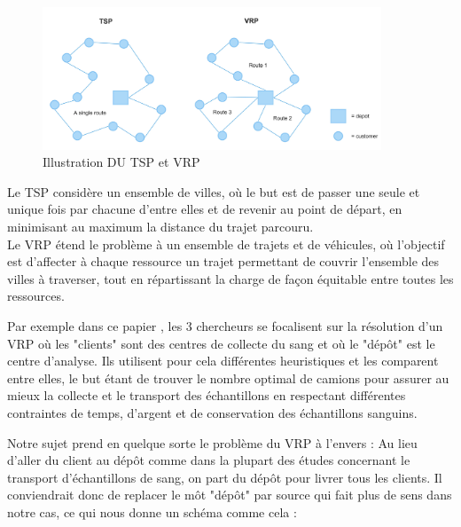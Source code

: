 \documentclass{polytech/polytech}
\numberwithin{figure}{chapter}
\begin{document}
\begin{figure}[h]
    \centering
    \includegraphics[width=0.9\textwidth]{pic/TSPVRP.png}
    \caption{Illustration DU TSP et VRP}
    \label{Illustration DU TSP et VRP}
\end{figure}

Le TSP considère un ensemble de villes, où le but est de passer une seule et unique fois par chacune d'entre elles et de revenir au point de départ, en minimisant au maximum la distance du trajet parcouru.\\
Le VRP étend le problème à un ensemble de trajets et de véhicules, où l'objectif est d'affecter à chaque ressource un trajet permettant de couvrir l'ensemble des villes à traverser, tout en répartissant la charge de façon équitable entre toutes les ressources. 

Par exemple dans ce papier \cite{VRP}, les 3 chercheurs se focalisent sur la résolution d'un VRP où les "clients" sont des centres de collecte du sang et où le "dépôt" est le centre d'analyse. Ils utilisent pour cela différentes \gls{heuristiques} et les comparent entre elles, le but étant de trouver le nombre optimal de camions pour assurer au mieux la collecte et le transport des échantillons en respectant différentes contraintes de temps, d'argent et de conservation des échantillons sanguins.

Notre sujet prend en quelque sorte le problème du VRP à l'envers : Au lieu d'aller du client au dépôt comme dans la plupart des études concernant le transport d'échantillons de sang, on part du dépôt pour livrer tous les clients. Il conviendrait donc de replacer le môt "dépôt" par source qui fait plus de sens dans notre cas, ce qui nous donne un schéma comme cela : 
\end{document}
